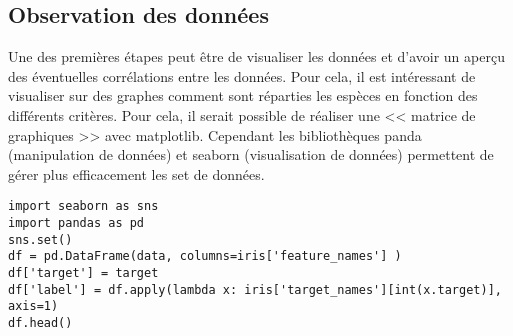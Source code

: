 \subsection{Observation des données}
Une des premières étapes peut être de visualiser les données et d'avoir un aperçu des éventuelles corrélations entre les données. Pour cela, il est intéressant de visualiser sur des graphes comment sont réparties les espèces en fonction des différents critères. 
Pour cela, il serait possible de réaliser une << matrice de graphiques >> avec matplotlib. Cependant les bibliothèques panda (manipulation de données) et seaborn (visualisation de données) permettent de gérer plus efficacement les set de données. 

\begin{verbatim}
import seaborn as sns
import pandas as pd
sns.set()
df = pd.DataFrame(data, columns=iris['feature_names'] )
df['target'] = target
df['label'] = df.apply(lambda x: iris['target_names'][int(x.target)], axis=1)
df.head()
\end{verbatim}